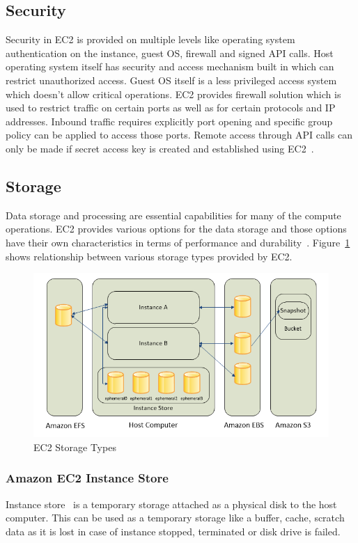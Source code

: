 \subsection{Security}
Security in EC2 is provided on multiple levels like operating system
authentication on the instance, guest OS, firewall and signed API
calls. Host operating system itself has security and access mechanism
built in which can restrict unauthorized access. Guest OS itself is a
less privileged access system which doesn't allow critical
operations. EC2 provides firewall solution which is used to restrict
traffic on certain ports as well as for certain protocols and IP
addresses. Inbound traffic requires explicitly port opening and
specific group policy can be applied to access those ports. Remote
access through API calls can only be made if secret access key is
created and established using
EC2~\cite{hid-sp18-402-www-aws-ec2Security}.

\subsection{Storage}
Data storage and processing are essential capabilities for many of the
compute operations. EC2 provides various options for the data storage
and those options have their own characteristics in terms of
performance and
durability~\cite{hid-sp18-402-www-aws-ec2Storage}. Figure~\ref{f:ec2-storage}
shows relationship between various storage types provided by EC2.
\begin{figure}[!ht]
  \centering\includegraphics[width=\columnwidth]
{images/ec2Storage.PNG} \caption{EC2
  Storage
  Types~\cite{hid-sp18-402-www-aws-ec2Storage}}
\label{f:ec2-storage}
\end{figure}

\subsubsection{Amazon EC2 Instance Store} 
Instance store~\cite{hid-sp18-402-www-aws-ec2Storage} is a temporary
storage attached as a physical disk to the host computer. This can be
used as a temporary storage like a buffer, cache, scratch data as it
is lost in case of instance stopped, terminated or disk drive is
failed.
